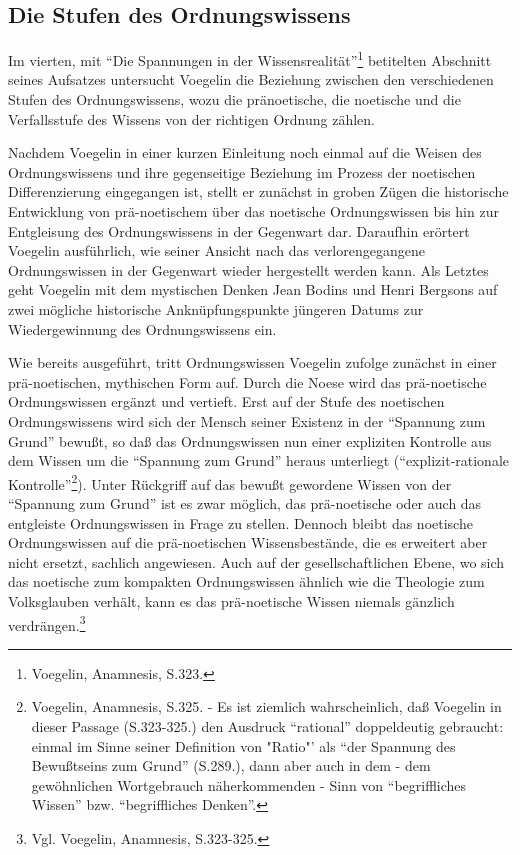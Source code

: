

\subsection{Die Stufen des Ordnungswissens}

Im vierten, mit "`Die Spannungen in der Wissensrealität"'\footnote{Voegelin,
  Anamnesis, S.323.} betitelten Abschnitt seines Aufsatzes untersucht Voegelin
die Beziehung zwischen den verschiedenen Stufen des Ordnungswissens, wozu die
pränoetische, die noetische und die Verfallsstufe des Wissens von der
richtigen Ordnung zählen.

Nachdem Voegelin in einer kurzen Einleitung noch einmal auf die Weisen des
Ordnungswissens und ihre gegenseitige Beziehung im Prozess der noetischen
Differenzierung eingegangen ist, stellt er zunächst in groben Zügen die
historische Entwicklung von prä-noetischem über das noetische Ordnungswissen
bis hin zur Entgleisung des Ordnungswissens in der Gegenwart dar. Daraufhin
erörtert Voegelin ausführlich, wie seiner Ansicht nach das verlorengegangene
Ordnungswissen in der Gegenwart wieder hergestellt werden kann. Als Letztes
geht Voegelin mit dem mystischen Denken Jean Bodins und Henri Bergsons auf
zwei mögliche historische Anknüpfungspunkte jüngeren Datums zur
Wiedergewinnung des Ordnungswissens ein.

Wie bereits ausgeführt, tritt Ordnungswissen Voegelin zufolge zunächst in
einer prä-noetischen, mythischen Form auf. Durch die Noese wird das
prä-noetische Ordnungswissen ergänzt und vertieft. Erst auf der Stufe des
noetischen Ordnungswissens wird sich der Mensch seiner Existenz in der
"`Spannung zum Grund"' bewußt, so daß das Ordnungswissen nun einer expliziten
Kontrolle aus dem Wissen um die "`Spannung zum Grund"' heraus unterliegt
("`explizit-rationale Kontrolle"'\footnote{Voegelin, Anamnesis, S.325. - Es
  ist ziemlich wahrscheinlich, daß Voegelin in dieser Passage (S.323-325.) den
  Ausdruck "`rational"' doppeldeutig gebraucht: einmal im Sinne seiner
  Definition von "Ratio"' als "`der Spannung des Bewußtseins zum Grund"'
  (S.289.), dann aber auch in dem - dem gewöhnlichen Wortgebrauch
  näherkommenden - Sinn von "`begriffliches Wissen"' bzw. "`begriffliches
  Denken"'.}). Unter Rückgriff auf das bewußt gewordene Wissen von der
"`Spannung zum Grund"' ist es zwar möglich, das prä-noetische oder auch das
entgleiste Ordnungswissen in Frage zu stellen. Dennoch bleibt das noetische
Ordnungswissen auf die prä-noetischen Wissensbestände, die es erweitert aber
nicht ersetzt, sachlich angewiesen. Auch auf der gesellschaftlichen Ebene, wo
sich das noetische zum kompakten Ordnungswissen ähnlich wie die Theologie zum
Volksglauben verhält, kann es das prä-noetische Wissen niemals gänzlich
verdrängen.\footnote{Vgl. Voegelin, Anamnesis, S.323-325.}

